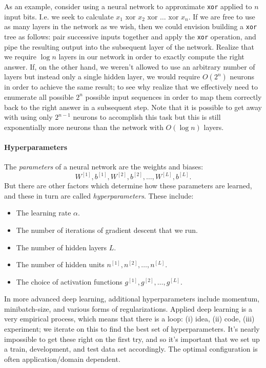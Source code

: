 \documentclass[12pt]{article}
\begin{document}
As an example, consider using a neural network to approximate \texttt{xor} applied to $n$ input bits. I.e. we seek to calculate $x_1 \textrm{ xor } x_2 \textrm{ xor } \ldots \textrm{ xor } x_n$. If we are free to use as many layers in the network as we wish, then we could envision building a \texttt{xor} tree as follows: pair successive inputs together and apply the \texttt{xor} operation, and pipe the resulting output into the subsequent layer of the network. Realize that we require $\log n$ layers in our network in order to exactly compute the right answer. If, on the other hand, we weren't allowed to use an arbitrary number of layers but instead only a single hidden layer, we would require $O(2^n)$ neurons in order to achieve the same result; to see why realize that we effectively need to enumerate all possible $2^n$ possible input sequences in order to map them correctly back to the right answer in a subsequent step. Note that it is possible to get away with using only $2^{n-1}$ neurons to accomplish this task but this is still exponentially more neurons than the network with $O(\log n)$ layers.

\paragraph{Hyperparameters}
The \emph{parameters} of a neural network are the weights and biases:
\[
W^{[1]}, b^{[1]}, W^{[2]}, b^{[2]}, \ldots, W^{[L]}, b^{[L]}. 
\]
But there are other factors which determine how these parameters are learned, and these in turn are called \emph{hyperparameters}. These include:
\begin{itemize} \item The learning rate $\alpha$.
\item The number of iterations of gradient descent that we run.
\item The number of hidden layers $L$.
\item The number of hidden units $n^{[1]}, n^{[2]}, \ldots, n^{[L]}$.
\item The choice of activation functions $g^{[1]}, g^{[2]}, \ldots, g^{[L]}$. \end{itemize}

In more advanced deep learning, additional hyperparameters include momentum, minibatch-size, and various forms of regularizations.
Applied deep learning is a very empirical process, which means that there is a loop: (i) idea, (ii) code, (iii) experiment; we iterate on this to find the best set of hyperparameters. It's nearly impossible to get these right on the first try, and so it's important that we set up a train, development, and test data set accordingly. The optimal configuration is often application/domain dependent.
\end{document}
